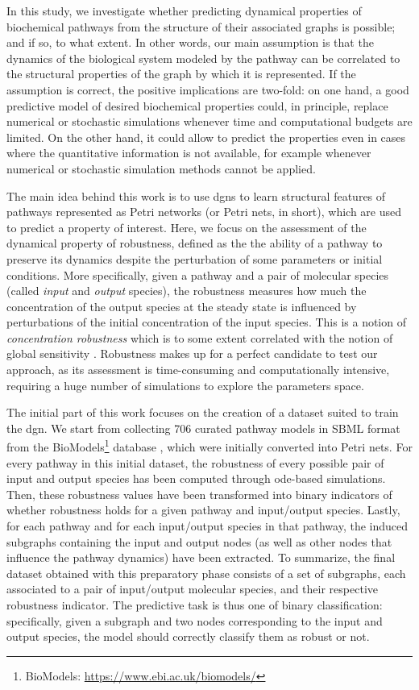 In this study, we investigate whether predicting dynamical properties of biochemical pathways from the structure of their associated graphs is possible; and if so, to what extent. In other words, our main assumption is that the dynamics of the biological system modeled by the pathway can be correlated to the structural properties of the graph by which it is represented. If the assumption is correct, the positive implications are two-fold: on one hand, a good predictive model of desired biochemical properties could, in principle, replace numerical or stochastic simulations whenever time and computational budgets are limited. On the other hand, it could allow to predict the properties even in cases where the quantitative information is not available, for example whenever numerical or stochastic simulation methods cannot be applied.

The main idea behind this work is to use \glspl{dgn} to learn structural features of pathways represented as Petri networks (or Petri nets, in short), which are used to predict a property of interest. Here, we focus on the assessment of the dynamical property of robustness, defined as the the ability of a pathway to preserve its dynamics despite the perturbation of some parameters or initial conditions. More specifically, given a pathway and a pair of molecular species (called \emph{input} and \emph{output} species), the robustness measures how much the concentration of the output species at the steady state is influenced by perturbations of the initial concentration of the input species. This is a notion of \emph{concentration robustness} \citep{kitano2004biological} which is to some extent correlated with the notion of global sensitivity \citep{zi2011sensitivity}. Robustness makes up for a perfect candidate to test our approach, as its assessment is time-consuming and computationally intensive, requiring a huge number of simulations to explore the parameters space.

The initial part of this work focuses on the creation of a dataset suited to train the \gls{dgn}. We start from collecting 706 curated pathway models in SBML format from the BioModels\footnote{BioModels: \url{https://www.ebi.ac.uk/biomodels/}} database \citep{li2010biomodels}, which were initially converted into Petri nets. For every pathway in this initial dataset, the robustness of every possible pair of input and output species has been computed through \gls{ode}-based simulations. Then, these robustness values have been transformed into binary indicators of whether robustness holds for a given pathway and input/output species. Lastly, for each pathway and for each input/output species in that pathway, the induced subgraphs containing the input and output nodes (as well as other nodes that influence the pathway dynamics) have been extracted. To summarize, the final dataset obtained with this preparatory phase consists of a set of subgraphs, each associated to a pair of input/output molecular species, and their respective robustness indicator. The predictive task is thus one of binary classification: specifically, given a subgraph and two nodes corresponding to the input and output species, the model should correctly classify them as robust or not.

